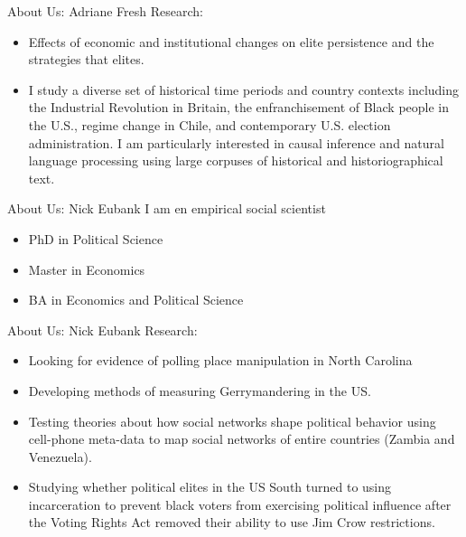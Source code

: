 \documentclass[11pt]{beamer}
\begin{document}
\begin{frame}[c]{About Us: Adriane Fresh}
	Research:
	\begin{itemize}
		\pause \item Effects of economic and institutional changes on elite persistence and the strategies that elites.
		\pause \item I study a diverse set of historical time periods and country contexts including the Industrial Revolution in Britain, the enfranchisement of Black people in the U.S., regime change in Chile, and contemporary U.S. election administration. 
		\pause I am particularly interested in causal inference and natural language processing using large corpuses of historical and historiographical text.
	\end{itemize}
\end{frame}



\begin{frame}[c]{About Us: Nick Eubank}
	I am en empirical social scientist\\
	\vspace{0.5cm}
	\begin{itemize}
		\pause \item PhD in Political Science
		\pause \item Master in Economics
		\pause \item BA in Economics and Political Science
	\end{itemize}
\end{frame}

\begin{frame}[c]{About Us: Nick Eubank}
	Research:
	\begin{itemize}
		\pause \item Looking for evidence of polling place manipulation in North Carolina
		\pause \item Developing methods of measuring Gerrymandering in the US.
		\pause \item Testing theories about how social networks shape political behavior using cell-phone meta-data to map social networks of entire countries (Zambia and Venezuela).
		\pause \item Studying whether political elites in the US South turned to using incarceration to prevent black voters from exercising political influence after the Voting Rights Act removed their ability to use Jim Crow restrictions.
	\end{itemize}
\end{frame}
\end{document}
